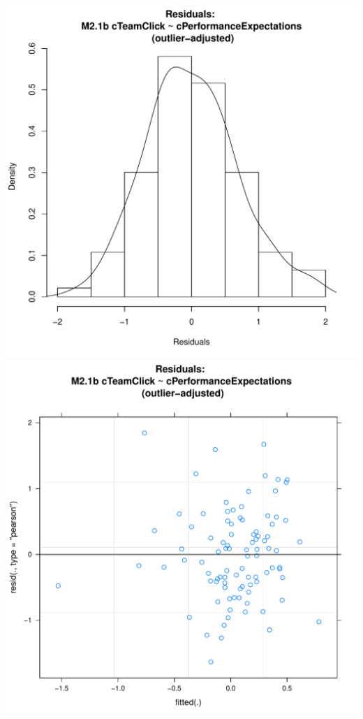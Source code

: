 \documentclass[12pt]{report}
\begin{document}
\newpage
\includegraphics[scale =.4]{../images/MLM21bOutHist.pdf}
\includegraphics[scale =.4]{../images/MLM21bOutScatter.pdf}
\end{document}
